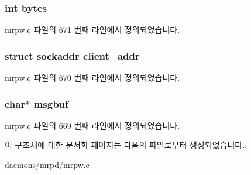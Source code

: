 \subsubsection[{\texorpdfstring{bytes}{bytes}}]{\setlength{\rightskip}{0pt plus 5cm}int bytes}\hypertarget{structctl__thread__params_a3e18e5ab1201e205ce88c473a2f4bf99}{}\label{structctl__thread__params_a3e18e5ab1201e205ce88c473a2f4bf99}


mrpw.\+c 파일의 671 번째 라인에서 정의되었습니다.

\subsubsection[{\texorpdfstring{client\+\_\+addr}{client_addr}}]{\setlength{\rightskip}{0pt plus 5cm}struct sockaddr client\+\_\+addr}\hypertarget{structctl__thread__params_a877f810975609de209847d7157b0ba67}{}\label{structctl__thread__params_a877f810975609de209847d7157b0ba67}


mrpw.\+c 파일의 670 번째 라인에서 정의되었습니다.

\subsubsection[{\texorpdfstring{msgbuf}{msgbuf}}]{\setlength{\rightskip}{0pt plus 5cm}char$\ast$ msgbuf}\hypertarget{structctl__thread__params_a3820841c4bbf28f04505bea65d6b84f7}{}\label{structctl__thread__params_a3820841c4bbf28f04505bea65d6b84f7}


mrpw.\+c 파일의 669 번째 라인에서 정의되었습니다.



이 구조체에 대한 문서화 페이지는 다음의 파일로부터 생성되었습니다.\+:\begin{DoxyCompactItemize}
\item 
daemons/mrpd/\hyperlink{mrpw_8c}{mrpw.\+c}\end{DoxyCompactItemize}
